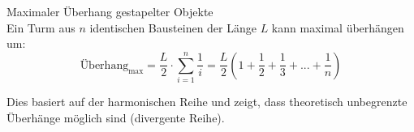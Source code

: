 \begin{example2}{Maximaler Überhang gestapelter Objekte}\\
    Ein Turm aus $n$ identischen Bausteinen der Länge $L$ kann maximal überhängen um:
    \begin{equation}
        \text{Überhang}_{\text{max}} = \frac{L}{2} \cdot \sum_{i=1}^{n} \frac{1}{i} = \frac{L}{2}(1 + \frac{1}{2} + \frac{1}{3} + ... + \frac{1}{n})
    \end{equation}
    
    Dies basiert auf der harmonischen Reihe und zeigt, dass theoretisch unbegrenzte Überhänge möglich sind (divergente Reihe).
\end{example2}
